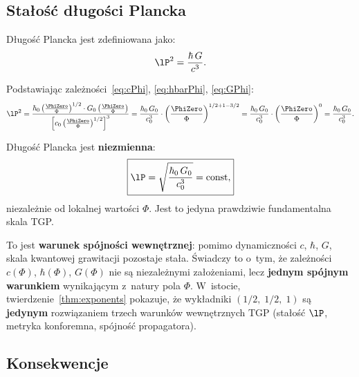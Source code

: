 \subsection{Sta\l{}o\'s\'c d\l{}ugo\'sci Plancka}\label{ssec:lP}\label{ssec:naturalunits}

D\l{}ugo\'s\'c Plancka jest zdefiniowana jako:
\begin{equation}
    \lP^2 = \frac{\hbar\,G}{c^3}.
\end{equation}

Podstawiaj\k{a}c zale\.zno\'sci~\eqref{eq:cPhi}, \eqref{eq:hbarPhi},
\eqref{eq:GPhi}:
\begin{equation}
    \lP^2
    = \frac{\hbar_0\left(\frac{\PhiZero}{\Phi}\right)^{1/2}
            \cdot G_0\left(\frac{\PhiZero}{\Phi}\right)}
           {\left[c_0\left(\frac{\PhiZero}{\Phi}\right)^{1/2}\right]^3}
    = \frac{\hbar_0\,G_0}{c_0^3}
      \cdot \left(\frac{\PhiZero}{\Phi}\right)^{1/2+1-3/2}
    = \frac{\hbar_0\,G_0}{c_0^3}
      \cdot \left(\frac{\PhiZero}{\Phi}\right)^{0}
    = \frac{\hbar_0\,G_0}{c_0^3}.
\end{equation}

\begin{theorem}\label{thm:lP}
D\l{}ugo\'s\'c Plancka jest \textbf{niezmienna}:
\begin{equation}\label{eq:lP-const}
    \boxed{\lP = \sqrt{\frac{\hbar_0\,G_0}{c_0^3}} = \mathrm{const},}
\end{equation}
niezale\.znie od lokalnej warto\'sci $\Phi$. Jest to jedyna
prawdziwie fundamentalna skala TGP.
\end{theorem}

To jest \textbf{warunek sp\'ojno\'sci wewn\k{e}trznej}: pomimo
dynamiczno\'sci $c$, $\hbar$, $G$, skala kwantowej grawitacji
pozostaje sta\l{}a. \'Swiadczy to o~tym, \.ze zale\.zno\'sci
$c(\Phi)$, $\hbar(\Phi)$, $G(\Phi)$ nie s\k{a} niezale\.znymi
za\l{}o\.zeniami, lecz \textbf{jednym sp\'ojnym warunkiem}
wynikaj\k{a}cym z~natury pola $\Phi$.
W~istocie, twierdzenie~\ref{thm:exponents} pokazuje, \.ze
wyk\l{}adniki $(1/2,\;1/2,\;1)$ s\k{a} \textbf{jedynym}
rozwi\k{a}zaniem trzech warunk\'ow wewn\k{e}trznych TGP
(sta\l{}o\'s\'c $\lP$, metryka konforemna, sp\'ojno\'s\'c
propagatora).

\subsection{Konsekwencje}\label{ssec:stale-kons}

